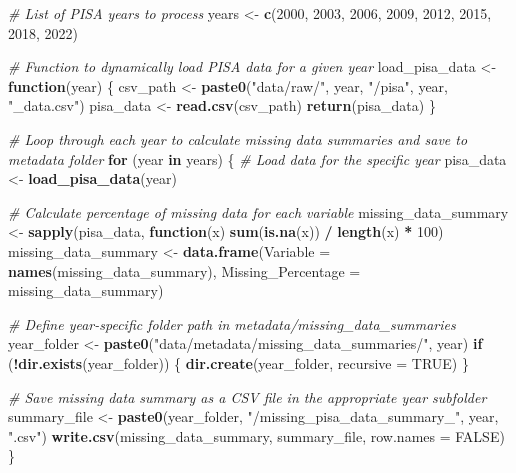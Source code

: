\documentclass[
]{article}
\newenvironment{Shaded}{\begin{snugshade}}{\end{snugshade}}
\newcommand{\AttributeTok}[1]{\textcolor[rgb]{0.13,0.29,0.53}{#1}}
\newcommand{\CommentTok}[1]{\textcolor[rgb]{0.56,0.35,0.01}{\textit{#1}}}
\newcommand{\ConstantTok}[1]{\textcolor[rgb]{0.56,0.35,0.01}{#1}}
\newcommand{\ControlFlowTok}[1]{\textcolor[rgb]{0.13,0.29,0.53}{\textbf{#1}}}
\newcommand{\DecValTok}[1]{\textcolor[rgb]{0.00,0.00,0.81}{#1}}
\newcommand{\FunctionTok}[1]{\textcolor[rgb]{0.13,0.29,0.53}{\textbf{#1}}}
\newcommand{\NormalTok}[1]{#1}
\newcommand{\OtherTok}[1]{\textcolor[rgb]{0.56,0.35,0.01}{#1}}
\newcommand{\SpecialCharTok}[1]{\textcolor[rgb]{0.81,0.36,0.00}{\textbf{#1}}}
\newcommand{\StringTok}[1]{\textcolor[rgb]{0.31,0.60,0.02}{#1}}
\begin{document}
\begin{Shaded}
\begin{Highlighting}[]
\CommentTok{\# List of PISA years to process}
\NormalTok{years }\OtherTok{\textless{}{-}} \FunctionTok{c}\NormalTok{(}\DecValTok{2000}\NormalTok{, }\DecValTok{2003}\NormalTok{, }\DecValTok{2006}\NormalTok{, }\DecValTok{2009}\NormalTok{, }\DecValTok{2012}\NormalTok{, }\DecValTok{2015}\NormalTok{, }\DecValTok{2018}\NormalTok{, }\DecValTok{2022}\NormalTok{)}

\CommentTok{\# Function to dynamically load PISA data for a given year}
\NormalTok{load\_pisa\_data }\OtherTok{\textless{}{-}} \ControlFlowTok{function}\NormalTok{(year) \{}
\NormalTok{    csv\_path }\OtherTok{\textless{}{-}} \FunctionTok{paste0}\NormalTok{(}\StringTok{"data/raw/"}\NormalTok{, year, }\StringTok{"/pisa"}\NormalTok{, year, }\StringTok{"\_data.csv"}\NormalTok{)}
\NormalTok{    pisa\_data }\OtherTok{\textless{}{-}} \FunctionTok{read.csv}\NormalTok{(csv\_path)}
    \FunctionTok{return}\NormalTok{(pisa\_data)}
\NormalTok{\}}

\CommentTok{\# Loop through each year to calculate missing data summaries and save to metadata folder}
\ControlFlowTok{for}\NormalTok{ (year }\ControlFlowTok{in}\NormalTok{ years) \{}
    \CommentTok{\# Load data for the specific year}
\NormalTok{    pisa\_data }\OtherTok{\textless{}{-}} \FunctionTok{load\_pisa\_data}\NormalTok{(year)}
    
    \CommentTok{\# Calculate percentage of missing data for each variable}
\NormalTok{    missing\_data\_summary }\OtherTok{\textless{}{-}} \FunctionTok{sapply}\NormalTok{(pisa\_data, }\ControlFlowTok{function}\NormalTok{(x) }\FunctionTok{sum}\NormalTok{(}\FunctionTok{is.na}\NormalTok{(x)) }\SpecialCharTok{/} \FunctionTok{length}\NormalTok{(x) }\SpecialCharTok{*} \DecValTok{100}\NormalTok{)}
\NormalTok{    missing\_data\_summary }\OtherTok{\textless{}{-}} \FunctionTok{data.frame}\NormalTok{(}\AttributeTok{Variable =} \FunctionTok{names}\NormalTok{(missing\_data\_summary),}
                                       \AttributeTok{Missing\_Percentage =}\NormalTok{ missing\_data\_summary)}
    
    \CommentTok{\# Define year{-}specific folder path in metadata/missing\_data\_summaries}
\NormalTok{    year\_folder }\OtherTok{\textless{}{-}} \FunctionTok{paste0}\NormalTok{(}\StringTok{"data/metadata/missing\_data\_summaries/"}\NormalTok{, year)}
    \ControlFlowTok{if}\NormalTok{ (}\SpecialCharTok{!}\FunctionTok{dir.exists}\NormalTok{(year\_folder)) \{}
        \FunctionTok{dir.create}\NormalTok{(year\_folder, }\AttributeTok{recursive =} \ConstantTok{TRUE}\NormalTok{)}
\NormalTok{    \}}
    
    \CommentTok{\# Save missing data summary as a CSV file in the appropriate year subfolder}
\NormalTok{    summary\_file }\OtherTok{\textless{}{-}} \FunctionTok{paste0}\NormalTok{(year\_folder, }\StringTok{"/missing\_pisa\_data\_summary\_"}\NormalTok{, year, }\StringTok{".csv"}\NormalTok{)}
    \FunctionTok{write.csv}\NormalTok{(missing\_data\_summary, summary\_file, }\AttributeTok{row.names =} \ConstantTok{FALSE}\NormalTok{)}
\NormalTok{\}}
\end{Highlighting}
\end{Shaded}
\end{document}
